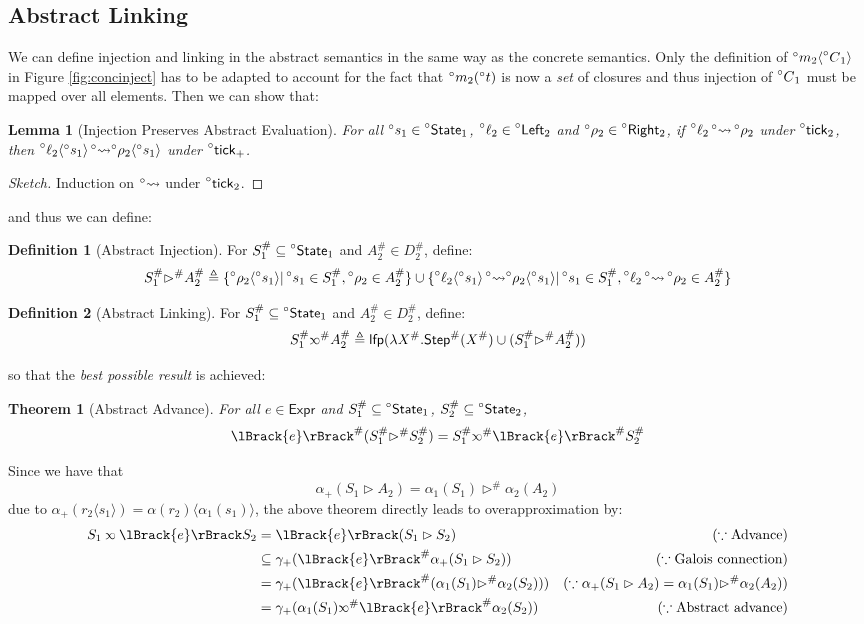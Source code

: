 \documentclass[acmsmall,review]{acmart}\settopmatter{printfolios=true,printccs=false,printacmref=false}
\theoremstyle{definition}
\newtheorem{defn}{Definition}[section]
\theoremstyle{plain}
\newtheorem{lem}{Lemma}[section]
\newtheorem{thm}{Theorem}[section]
\newcommand*{\A}[1]{\prescript{\circ}{}{#1}}
\newcommand*{\Abs}[1]{{#1}^{\#}}
\newcommand*{\Expr}{\mathsf{Expr}}
\newcommand*{\Left}{\mathsf{Left}}
\newcommand*{\Right}{\mathsf{Right}}
\newcommand*{\mem}{m}
\newcommand*{\State}{\mathsf{State}}
\newcommand*{\lfp}{\mathsf{lfp}}
\newcommand*{\Step}{\mathsf{Step}}
\newcommand*{\semarrow}{\rightsquigarrow}
\newcommand*{\semlink}{\mathbin{\rotatebox[origin=c]{180}{$\propto$}}}
\newcommand*{\sembracket}[1]{\lBrack{#1}\rBrack}
\newcommand*{\tick}{\mathsf{tick}}
\newcommand*{\inject}[2]{{#2}\langle{#1}\rangle}
\begin{document}
\subsection{Abstract Linking}
We can define injection and linking in the abstract semantics in the same way as the concrete semantics.
Only the definition of $\inject{\A{C}_1}{\A\mem_2}$ in Figure \ref{fig:concinject} has to be adapted to account for the fact that $\A\mem_2(\A{t})$ is now a \emph{set} of closures and thus injection of $\A{C}_1$ must be mapped over all elements.
Then we can show that:
\begin{lem}[Injection Preserves Abstract Evaluation]
  For all $\A{s}_1\in\A\State_1$, $\A\ell_2\in\A\Left_2$ and $\A\rho_2\in\A\Right_2$, if $\A\ell_2\A\semarrow\A\rho_2$ under $\A\tick_2$,
  then $\inject{\A{s}_1}{\A\ell_2}\A\semarrow\inject{\A{s}_1}{\A\rho_2}$ under $\A\tick_+$.
\end{lem}
\begin{proof}[Sketch]
  Induction on $\A\semarrow$ under $\A\tick_2$.
\end{proof}
and thus we can define:
\begin{defn}[Abstract Injection]
  For $\Abs{S}_1\subseteq\A\State_1$ and $\Abs{A}_2\in\Abs{D}_2$, define:
  \[
    \Abs{S}_1\Abs\rhd\Abs{A}_2\triangleq\{\inject{\A{s}_1}{\A\rho_2}|\A{s}_1\in\Abs{S}_1,\A\rho_2\in\Abs{A}_2\}\cup\{\inject{\A{s}_1}{\A\ell_2}\A\semarrow\inject{\A{s}_1}{\A\rho_2}|\A{s}_1\in\Abs{S}_1,\A\ell_2\A\semarrow\A\rho_2\in\Abs{A}_2\}
  \]
\end{defn}
\begin{defn}[Abstract Linking]
  For $\Abs{S}_1\subseteq\A\State_1$ and $\Abs{A}_2\in\Abs{D}_2$, define:
  \[
    \Abs{S}_1\Abs\semlink\Abs{A}_2\triangleq\lfp(\lambda\Abs{X}.\Abs\Step(\Abs{X})\cup(\Abs{S}_1\Abs\rhd\Abs{A}_2))
  \]
\end{defn}
so that the \emph{best possible result} is achieved:
\begin{thm}[Abstract Advance]
  For all $e\in\Expr$ and $\Abs{S}_1\subseteq\A\State_1$, $\Abs{S}_2\subseteq\A\State_2$,
  \[
    \Abs{\sembracket{e}}(\Abs{S}_1\Abs\rhd\Abs{S}_2)=\Abs{S}_1\Abs\semlink\Abs{\sembracket{e}}\Abs{S}_2
  \]
\end{thm}
Since we have that
\[
  \alpha_+(S_1\rhd A_2)=\alpha_1(S_1)\Abs\rhd\alpha_2(A_2)
\]
due to $\alpha_+(\inject{s_1}{r_2})=\inject{\alpha_1(s_1)}{\alpha(r_2)}$, the above theorem directly leads to overapproximation by:
\begin{align*}
  S_1\semlink\sembracket{e}S_2 & =\sembracket{e}(S_1\rhd S_2)                                          & (\because\text{Advance})                                           \\
                               & \subseteq\gamma_+(\Abs{\sembracket{e}}\alpha_+(S_1\rhd S_2))          & (\because\text{Galois connection})                                 \\
                               & =\gamma_+(\Abs{\sembracket{e}}(\alpha_1(S_1)\Abs\rhd\alpha_2(S_2)))   & (\because\alpha_+(S_1\rhd A_2)=\alpha_1(S_1)\Abs\rhd\alpha_2(A_2)) \\
                               & =\gamma_+(\alpha_1(S_1)\Abs\semlink\Abs{\sembracket{e}}\alpha_2(S_2)) & (\because\text{Abstract advance})
\end{align*}
\end{document}
